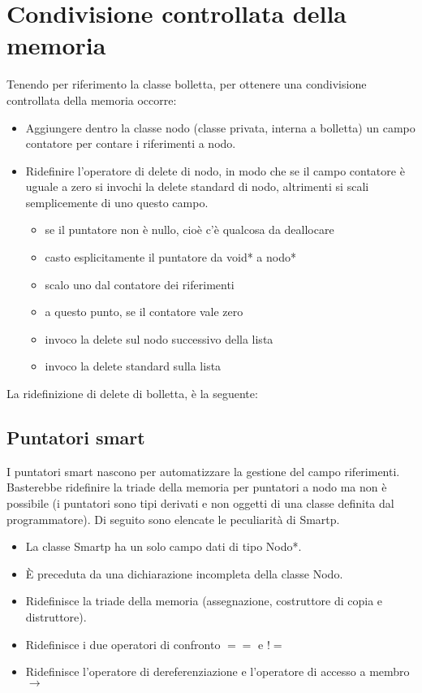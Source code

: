 \section{Condivisione controllata della memoria}
Tenendo per riferimento la classe bolletta, per ottenere una condivisione controllata della memoria occorre:
\begin{itemize}
	\item Aggiungere dentro la classe nodo (classe privata, interna a bolletta) un campo contatore per contare i riferimenti a nodo.
	\item Ridefinire l'operatore di delete di nodo, in modo che se il campo contatore è uguale a zero si invochi la delete standard di nodo, altrimenti si scali semplicemente di uno questo campo.
	\begin{itemize}
		\item se il puntatore non è nullo, cioè c'è qualcosa da deallocare
		\item casto esplicitamente il puntatore da void* a nodo*
		\item scalo uno dal contatore dei riferimenti
		\item a questo punto, se il contatore vale zero
		\item invoco la delete sul nodo successivo della lista
		\item invoco la delete standard sulla lista
	\end{itemize}	
\end{itemize}
La ridefinizione di delete di bolletta, è la seguente:


\subsection{Puntatori smart}
I puntatori smart nascono per automatizzare la gestione del campo riferimenti. Basterebbe ridefinire la triade della memoria per puntatori a nodo ma non è possibile (i puntatori sono tipi derivati e non oggetti di una classe definita dal programmatore). Di seguito sono elencate le peculiarità di Smartp.

\begin{itemize}
	\item La classe Smartp ha un solo campo dati di tipo Nodo*.
	\item \`{E} preceduta da una dichiarazione incompleta della classe Nodo.
	\item Ridefinisce la triade della memoria (assegnazione, costruttore di copia e distruttore).
	\item Ridefinisce i due operatori di confronto $ == $ e $ != $
	\item Ridefinisce l'operatore di dereferenziazione \textasteriskcentered e l'operatore di accesso a membro  $ \rightarrow  $
\end{itemize}

